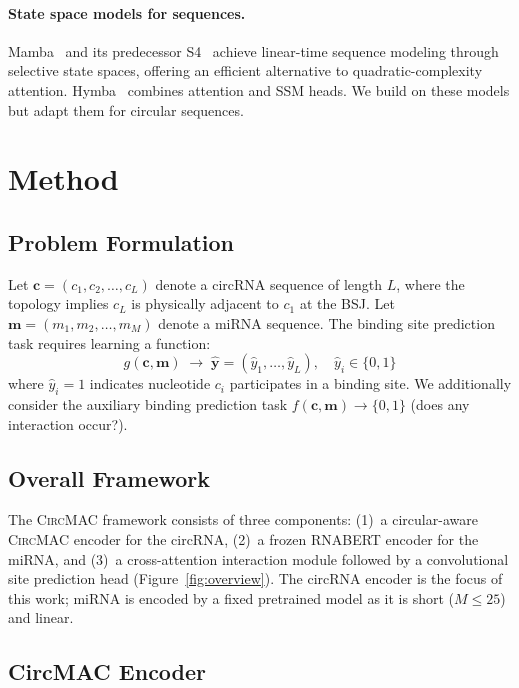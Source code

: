 \documentclass[10pt,twocolumn]{article}
\newcommand{\circmac}{\textsc{CircMAC}}
\begin{document}
\paragraph{State space models for sequences.}
Mamba~\cite{gu2023mamba} and its predecessor S4~\cite{gu2021efficiently}
achieve linear-time sequence modeling through selective state spaces,
offering an efficient alternative to quadratic-complexity attention.
Hymba~\cite{dong2024hymba} combines attention and SSM heads.
We build on these models but adapt them for circular sequences.

\section{Method}
\label{sec:method}

\subsection{Problem Formulation}

Let $\mathbf{c} = (c_1, c_2, \ldots, c_L)$ denote a circRNA sequence of
length $L$, where the topology implies $c_L$ is physically adjacent to
$c_1$ at the BSJ.
Let $\mathbf{m} = (m_1, m_2, \ldots, m_M)$ denote a miRNA sequence.
The binding site prediction task requires learning a function:
\begin{equation}
  g(\mathbf{c}, \mathbf{m}) \;\to\; \hat{\mathbf{y}} = (\hat{y}_1, \ldots, \hat{y}_L),
  \quad \hat{y}_i \in \{0,1\}
\end{equation}
where $\hat{y}_i=1$ indicates nucleotide $c_i$ participates in a binding
site. We additionally consider the auxiliary binding prediction task
$f(\mathbf{c},\mathbf{m}) \to \{0,1\}$ (does any interaction occur?).

\subsection{Overall Framework}

The \circmac{} framework consists of three components:
(1)~a circular-aware \circmac{} encoder for the circRNA,
(2)~a frozen RNABERT encoder for the miRNA,
and (3)~a cross-attention interaction module followed by a convolutional
site prediction head (Figure~\ref{fig:overview}).
The circRNA encoder is the focus of this work; miRNA is encoded by a
fixed pretrained model as it is short ($M \leq 25$) and linear.

\subsection{CircMAC Encoder}
\end{document}
